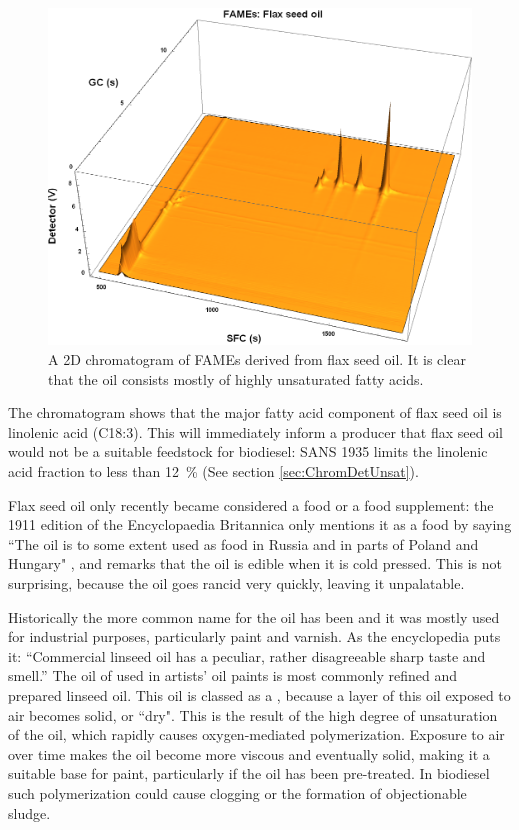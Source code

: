 \begin{figure}
\centering
\includegraphics[width=\textwidth]{Figures/Flax44.png}
\decoRule

\caption[SFC×GC of flax seed oil]{A 2D chromatogram of FAMEs derived from
flax seed oil. It is clear that the oil consists mostly of highly unsaturated fatty
acids.}

\label{fig:2DFlax}
\end{figure}

The chromatogram shows that the major fatty acid component of flax seed oil is
linolenic acid (C18:3). This will immediately inform a producer that flax seed
oil would not be a suitable feedstock for biodiesel: SANS 1935 limits the
linolenic acid fraction to less than \SI{12}{\percent} (See section
\ref{sec:ChromDetUnsat}).

Flax seed oil only recently became considered a food or a food supplement: the
1911 edition of the Encyclopaedia Britannica only mentions it as a food by
saying ``The oil is to some extent used as food in Russia and in parts of Poland
and Hungary" \autocite{Linseed1911}, and remarks that the oil is edible when it
is cold pressed. This is not surprising, because the oil goes rancid very
quickly, leaving it unpalatable.

Historically the more common name for the oil has been  and
it was mostly used for industrial purposes, particularly paint and varnish.
As the encyclopedia puts it: ``Commercial linseed oil has a peculiar, rather
disagreeable sharp taste and smell.'' The oil of used in artists' oil paints is
most commonly refined and prepared linseed oil. This oil is classed as a
, because a layer of this oil exposed to air becomes solid,
or ``dry". This is the result of the high degree of unsaturation of the oil,
which rapidly causes oxygen-mediated polymerization. Exposure to air over time
makes the oil become more viscous and eventually solid, making it a suitable
base for paint, particularly if the oil has been pre-treated. In biodiesel such
polymerization could cause clogging or the formation of objectionable sludge.



